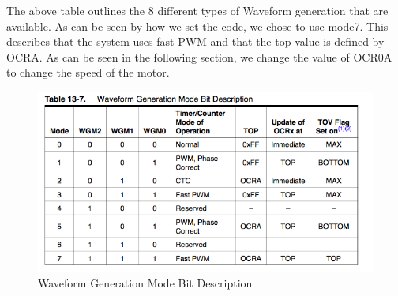 The above table outlines the 8 different types of  Waveform generation that are available. As can be seen by how we set the code, we chose to use mode7. This describes that the system uses fast PWM and that the top value is defined by OCRA.  As can be seen in the following section, we change the value of OCR0A to  change the speed of the motor.

\begin{figure}[h]
  \begin{center}
    \includegraphics[width=125mm]{imageSources/waveformGenerationTable.png}
  \end{center}
  \caption{Waveform Generation Mode Bit Description} 
  \label{waveformGenerationTable}
\end{figure}
